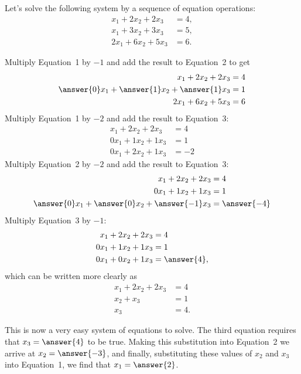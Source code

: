 \documentclass{ximera}
\begin{document}
\begin{example}
  Let's solve the following system by a sequence of equation operations:
  \begin{align*}
    x_1+2x_2+2x_3&=4,\\
    x_1+3x_2+3x_3&=5,\\
    2x_1+6x_2+5x_3&=6.
  \end{align*}

  \begin{exercise}
    Multiply Equation~1 by $-1$ and add the result to Equation~2 to get
    \begin{align*}
      x_1+2x_2+2x_3&=4\\
      \answer{0}x_1+\answer{1}x_2+ \answer{1} x_3&=1\\
      2x_1+6x_2+5x_3&=6
    \end{align*}
    Multiply Equation~1 by $-2$ and add the result to Equation~3:
    \begin{align*}
      x_1+2x_2+2x_3&=4\\
      0x_1+1x_2+ 1x_3&=1\\
      0x_1+2x_2+1x_3&=-2
    \end{align*}
    Multiply Equation~2 by $-2$ and add the result to Equation~3:
    \begin{align*}
      x_1+2x_2+2x_3&=4\\
      0x_1+1x_2+ 1x_3&=1\\
      \answer{0}x_1+\answer{0}x_2+\answer{-1}x_3&=\answer{-4}
    \end{align*}
    Multiply Equation~3 by $-1$:
    \begin{align*}
      x_1+2x_2+2x_3&=4\\
      0x_1+1x_2+ 1x_3&=1\\
      0x_1+0x_2+1x_3&=\answer{4},
    \end{align*}
    which can be written more clearly as
    \begin{align*}
      x_1+2x_2+2x_3&=4\\
      x_2+ x_3&=1\\
      x_3&=4.
    \end{align*}
  \end{exercise}

  \begin{question}
    This is now a very easy system of equations to solve.  The third
    equation requires that $x_3=\answer{4}$ to be true.  Making this substitution
    into Equation~2 we arrive at $x_2=\answer{-3}$, and finally, substituting
    these values of $x_2$ and $x_3$ into Equation~1, we find that
    $x_1=\answer{2}$.
    

\end{question}
\end{example}
\end{document}
